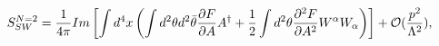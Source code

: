 \begin{equation}
S^{N=2}_{SW}=\frac{1}{4\pi} Im\left[ \int d^4 x \left( \int
d^{2}\theta d^{2}\bar{\theta}
\frac{\partial F}{\partial A}A^{\dagger }+\frac{1}{2}\int  d^{2}\theta \frac{\partial^{2}F}
{\partial A^{2}}W^{\alpha}W_{\alpha }\right) \right]+ {\cal O}(\frac{p^2}{\Lambda^2}),
 \label{sw}
\end{equation}

